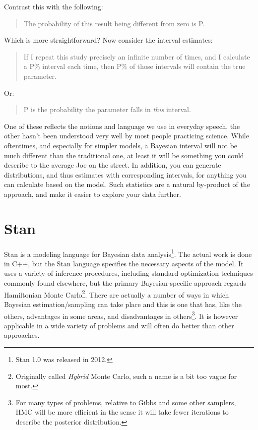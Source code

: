 \documentclass[]{book}
\let\rmarkdownfootnote\footnote%
\def\footnote{\protect\rmarkdownfootnote}
\begin{document}
Contrast this with the following:

\begin{quote}
The probability of this result being different from zero is P.
\end{quote}

Which is more straightforward? Now consider the interval estimates:

\begin{quote}
If I repeat this study precisely an infinite number of times, and I
calculate a P\% interval each time, then P\% of those intervals will
contain the true parameter.
\end{quote}

Or:

\begin{quote}
P is the probability the parameter falls in \emph{this} interval.
\end{quote}

One of these reflects the notions and language we use in everyday
speech, the other hasn't been understood very well by most people
practicing science. While oftentimes, and especially for simpler models,
a Bayesian interval will not be much different than the traditional one,
at least it will be something you could describe to the average Joe on
the street. In addition, you can generate distributions, and thus
estimates with corresponding intervals, for anything you can calculate
based on the model. Such statistics are a natural by-product of the
approach, and make it easier to explore your data further.

\chapter{Stan}\label{stan}

Stan is a modeling language for Bayesian data analysis\footnote{Stan 1.0
  was released in 2012.}. The actual work is done in C++, but the Stan
language specifies the necessary aspects of the model. It uses a variety
of inference procedures, including standard optimization techniques
commonly found elsewhere, but the primary Bayesian-specific approach
regards Hamiltonian Monte Carlo\footnote{Originally called \emph{Hybrid}
  Monte Carlo, such a name is a bit too vague for most.}. There are
actually a number of ways in which Bayesian estimation/sampling can take
place and this is one that has, like the others, advantages in some
areas, and disadvantages in others\footnote{For many types of problems,
  relative to Gibbs and some other samplers, HMC will be more efficient
  in the sense it will take fewer iterations to describe the posterior
  distribution.}. It is however applicable in a wide variety of problems
and will often do better than other approaches.
\end{document}
